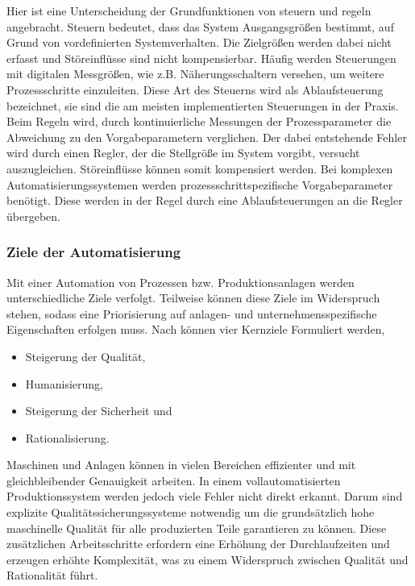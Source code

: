 Hier ist eine Unterscheidung der Grundfunktionen von steuern und regeln angebracht. Steuern bedeutet, dass das System Ausgangsgrößen bestimmt, auf Grund von vordefinierten Systemverhalten. Die Zielgrößen werden dabei nicht erfasst und Störeinflüsse sind nicht kompensierbar. Häufig werden Steuerungen mit digitalen Messgrößen, wie z.B. Näherungsschaltern versehen, um weitere Prozessschritte einzuleiten. Diese Art des Steuerns wird als Ablaufsteuerung bezeichnet, sie sind die am meisten implementierten Steuerungen in der Praxis. \\
Beim Regeln wird, durch kontinuierliche Messungen der Prozessparameter die Abweichung zu den Vorgabeparametern verglichen. Der dabei entstehende Fehler wird durch einen Regler, der die Stellgröße im System vorgibt, versucht auszugleichen. Störeinflüsse können somit kompensiert werden. Bei komplexen Automatisierungssystemen werden prozessschrittspezifische Vorgabeparameter benötigt. Diese werden in der Regel durch eine Ablaufsteuerungen an die Regler übergeben.      


\subsubsection{Ziele der Automatisierung}

Mit einer Automation von Prozessen bzw. Produktionsanlagen werden unterschiedliche Ziele verfolgt. Teilweise können diese Ziele im Widerspruch stehen, sodass eine Priorisierung auf anlagen- und unternehmensspezifische Eigenschaften erfolgen muss. Nach \cite{Heimbold.2015} können vier Kernziele Formuliert werden, 

\begin{itemize}
	\item Steigerung der Qualität,
	\item Humanisierung,
	\item Steigerung der Sicherheit und
	\item Rationalisierung.
\end{itemize}

Maschinen und Anlagen können in vielen Bereichen effizienter und mit gleichbleibender Genauigkeit arbeiten. In einem vollautomatisierten Produktionssystem werden jedoch viele Fehler nicht direkt erkannt. Darum sind explizite Qualitätssicherungssysteme notwendig um die grundsätzlich hohe maschinelle Qualität für alle produzierten Teile garantieren zu können. Diese zusätzlichen Arbeitsschritte erfordern eine Erhöhung der Durchlaufzeiten und erzeugen erhöhte Komplexität, was zu einem Widerspruch zwischen Qualität und Rationalität führt. 

